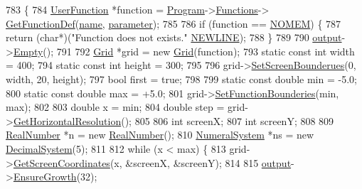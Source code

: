 \begin{DoxyCode}
783 \{
784     \hyperlink{classUserFunction}{UserFunction} *\textcolor{keyword}{function} = \hyperlink{classProgram}{Program}->\hyperlink{classProgram_ac643877adc06800a021263b2234cd236}{Functions}->
      \hyperlink{classFunctionList_acf0716fd18c32a6d52a947052060a2a1}{GetFunctionDef}(\hyperlink{classPlotStatement_ab057af7c22b9fd7ec06e530174dda200}{name}, \hyperlink{classPlotStatement_aa0356a6cdd1362b3efb6eb732249dcf2}{parameter});
785 
786     \textcolor{keywordflow}{if} (\textcolor{keyword}{function} == \hyperlink{platform_8h_a46ff2bfbf0d44b8466a2251d5bd5e6f8}{NOMEM}) \{
787         \textcolor{keywordflow}{return} (\textcolor{keywordtype}{char}*)(\textcolor{stringliteral}{"Function does not exists."} \hyperlink{platform_8h_a806511f4930171733227c99101dc0606}{NEWLINE});
788     \}
789 
790     \hyperlink{classSyntaxNode_a1180628cbe3fce43930cee0df5a9ce5c}{output}->\hyperlink{classCharBuffer_abe39d3fd7d8b9c8ec343af2cae7adc96}{Empty}();
791 
792     \hyperlink{classGrid}{Grid} *grid = \textcolor{keyword}{new} \hyperlink{classGrid}{Grid}(\textcolor{keyword}{function});
793     \textcolor{keyword}{static} \textcolor{keyword}{const} \textcolor{keywordtype}{int} width = 400;
794     \textcolor{keyword}{static} \textcolor{keyword}{const} \textcolor{keywordtype}{int} height = 300;
795 
796     grid->\hyperlink{classGrid_ac5386f4f62d3aae6a518fa11d25c7e59}{SetScreenBounderues}(0, width, 20, height);
797     \textcolor{keywordtype}{bool} first = \textcolor{keyword}{true};
798 
799     \textcolor{keyword}{static} \textcolor{keyword}{const} \textcolor{keywordtype}{double} min = -5.0;
800     \textcolor{keyword}{static} \textcolor{keyword}{const} \textcolor{keywordtype}{double} max = +5.0;
801     grid->\hyperlink{classGrid_ace057fbd3a401428399996eec3cb1577}{SetFunctionBounderies}(min, max);
802 
803     \textcolor{keywordtype}{double} x = min;
804     \textcolor{keywordtype}{double} step = grid->\hyperlink{classGrid_a9fa683c5f40922b5da39c647c4f4622d}{GetHorizontalResolution}();
805 
806     \textcolor{keywordtype}{int} screenX;
807     \textcolor{keywordtype}{int} screenY;
808 
809     \hyperlink{structRealNumber}{RealNumber} *n = \textcolor{keyword}{new} \hyperlink{structRealNumber}{RealNumber}();
810     \hyperlink{classNumeralSystem}{NumeralSystem} *ns = \textcolor{keyword}{new} \hyperlink{classDecimalSystem}{DecimalSystem}(5);
811 
812     \textcolor{keywordflow}{while} (x < max) \{
813         grid->\hyperlink{classGrid_a430009c581ae9350ec310f63c1b89140}{GetScreenCoordinates}(x, &screenX, &screenY);
814 
815         \hyperlink{classSyntaxNode_a1180628cbe3fce43930cee0df5a9ce5c}{output}->\hyperlink{classCharBuffer_a73c71d361110b37819a1d681a1504b0e}{EnsureGrowth}(32);

\end{DoxyCode}

